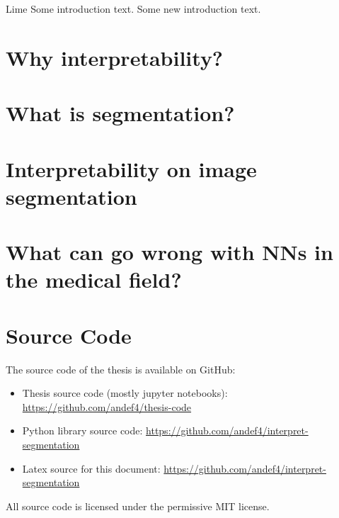 Lime \cite{ribeiro2016should}
Some introduction text.
Some new introduction text.

\section{Why interpretability?}
\section{What is segmentation?}
\section{Interpretability on image segmentation}
\section{What can go wrong with NNs in the medical field?}

\section{Source Code}
The source code of the thesis is available on GitHub:
\begin{itemize}
    \item Thesis source code (mostly jupyter notebooks): \url{https://github.com/andef4/thesis-code}
    \item Python library source code: \url{https://github.com/andef4/interpret-segmentation}
    \item Latex source for this document: \url{https://github.com/andef4/interpret-segmentation}
\end{itemize}

All source code is licensed under the permissive MIT license.